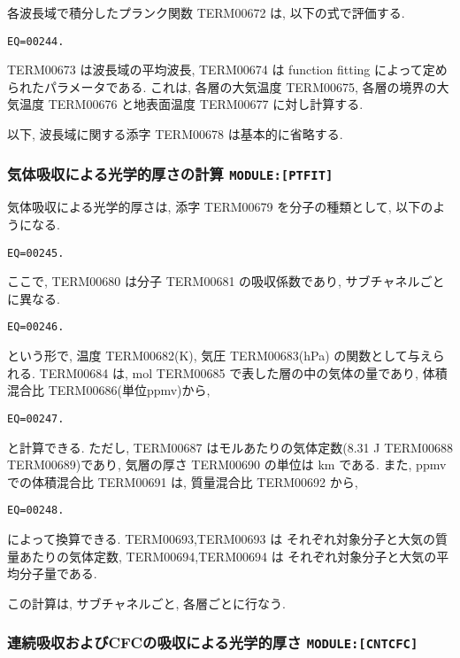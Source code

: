 各波長域で積分したプランク関数 TERM00672 は,
以下の式で評価する.

\begin{verbatim}
EQ=00244.
\end{verbatim}

TERM00673 は波長域の平均波長,
TERM00674 は function fitting によって定められたパラメータである.
これは, 各層の大気温度 TERM00675, 各層の境界の大気温度 TERM00676
と地表面温度 TERM00677 に対し計算する.

以下, 波長域に関する添字 TERM00678 は基本的に省略する.

\subsubsection{気体吸収による光学的厚さの計算 \texttt{MODULE:[PTFIT]}}

気体吸収による光学的厚さは, 添字 TERM00679 を分子の種類として,
以下のようになる. 

\begin{verbatim}
EQ=00245.
\end{verbatim}

ここで, TERM00680 は分子 TERM00681 の吸収係数であり, サブチャネルごとに異なる.

\begin{verbatim}
EQ=00246.
\end{verbatim}

という形で, 温度 TERM00682(K), 気圧 TERM00683(hPa) の関数として与えられる.
TERM00684 は, mol TERM00685 で表した層の中の気体の量であり,
体積混合比 TERM00686(単位ppmv)から,
\begin{verbatim}
EQ=00247.
\end{verbatim}
と計算できる. 
ただし, TERM00687 はモルあたりの気体定数(8.31 J TERM00688 TERM00689)であり,
気層の厚さ TERM00690 の単位は km である.
また, ppmv での体積混合比 TERM00691 は, 
質量混合比 TERM00692 から, 
\begin{verbatim}
EQ=00248.
\end{verbatim}
によって換算できる.
TERM00693,TERM00693 は
それぞれ対象分子と大気の質量あたりの気体定数,
TERM00694,TERM00694 は
それぞれ対象分子と大気の平均分子量である.

この計算は, サブチャネルごと, 各層ごとに行なう.

\subsubsection{連続吸収およびCFCの吸収による光学的厚さ \texttt{MODULE:[CNTCFC]}}

